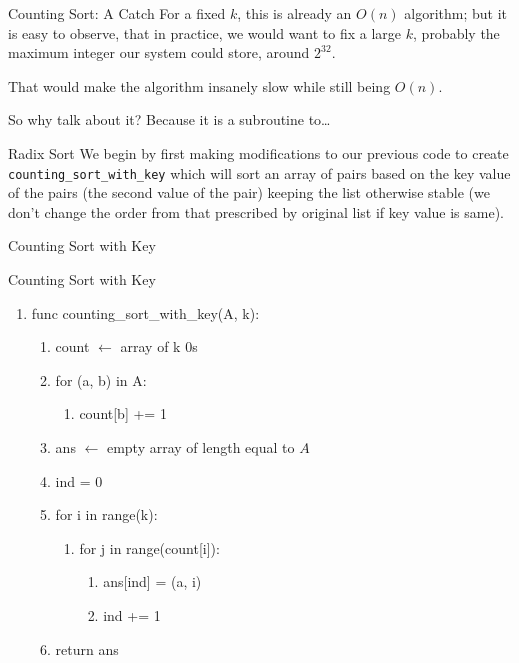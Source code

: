 \documentclass[9pt]{beamer}
\newenvironment{pseudobox}[1]{\begin{exampleblock}{#1}\ttfamily\begin{enumerate}[label=\arabic*.,leftmargin=1.4em,itemsep=0pt]}{\end{enumerate}\end{exampleblock}}
\begin{document}
\begin{frame}{Counting Sort: A Catch}
For a fixed $k$, this is already an $O(n)$ algorithm; but it is easy to observe, that in practice, we would want to fix a large $k$, probably the maximum integer our system could store, around $2^{32}$.

That would make the algorithm insanely slow while still being $O(n)$.

So why talk about it? Because it is a subroutine to\ldots
\end{frame}

\begin{frame}{Radix Sort}
We begin by first making modifications to our previous code to create \texttt{counting\_sort\_with\_key} which will sort an array of pairs based on the key value of the pairs (the second value of the pair) keeping the list otherwise stable (we don't change the order from that prescribed by original list if key value is same).
\end{frame}

\begin{frame}[fragile]{Counting Sort with Key}
\begin{pseudobox}{Counting Sort with Key}
\item func counting\_sort\_with\_key(A, k):
  \begin{enumerate}[label=\alph*.,leftmargin=1.4em,itemsep=0pt]
  \item count $\leftarrow$ array of k 0s
  \item for (a, b) in A:
    \begin{enumerate}[label=\roman*.,leftmargin=1.4em,itemsep=0pt]
    \item count[b] += 1
    \end{enumerate}
  \item ans $\leftarrow$ empty array of length equal to $A$
  \item ind = 0
  \item for i in range(k):
    \begin{enumerate}[label=\roman*.,leftmargin=1.4em,itemsep=0pt]
    \item for j in range(count[i]):
      \begin{enumerate}[label=--,leftmargin=1.4em,itemsep=0pt]
      \item ans[ind] = (a, i)
      \item ind += 1
      \end{enumerate}
    \end{enumerate}
  \item return ans
  \end{enumerate}
\end{pseudobox}
\end{frame}
\end{document}
